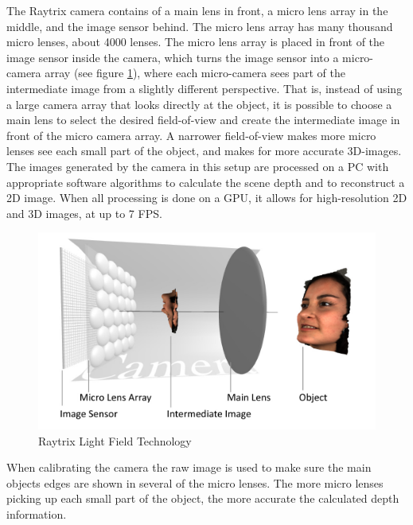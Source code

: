 The Raytrix camera contains of a main lens in front, a micro lens array in the middle, and the image sensor behind. The micro lens array has many thousand micro lenses, about 4000 lenses. The micro lens array is placed in front of the image sensor inside the camera, which turns the image sensor into a micro-camera array (see figure \ref{fig:light_field}), where each micro-camera sees part of the intermediate image from a slightly different perspective. That is, instead of using a large camera array that looks directly at the object, it is possible to choose a main lens to select the desired field-of-view and create the intermediate image in front of the micro camera array. A narrower field-of-view makes more micro lenses see each small part of the object, and makes for more accurate 3D-images. The images generated by the camera in this setup are processed on a PC with appropriate software algorithms to calculate the scene depth and to reconstruct a 2D image. When all processing is done on a GPU, it allows for high-resolution 2D and 3D images, at up to 7 FPS. \cite{website:raytrix_technology}

\begin{figure}[h]
    \centering
    \includegraphics[width=.9\linewidth]{images/hardware/Light-Field-Camera-Schematic}
    \caption{Raytrix Light Field Technology\cite{website:raytrix_technology}}
    \label{fig:light_field}
\end{figure}

When calibrating the camera the raw image is used to make sure the main objects edges are shown in several of the micro lenses. The more micro lenses picking up each small part of the object, the more accurate the calculated depth information. 


